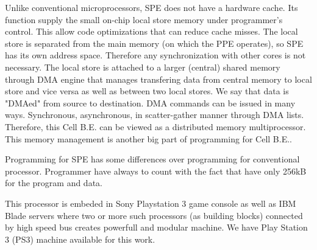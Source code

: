 \par
Unlike conventional microprocessors, SPE does not have a hardware cache.
Its function supply the small on-chip local store memory under programmer's control.
This allow code optimizations that can reduce cache misses.
The local store is separated from the main memory (on which the PPE operates), so SPE has its own address space.
Therefore any synchronization with other cores is not necessary.
The local store is attached to a larger (central) shared memory through DMA engine that manages transfering data from central memory to local store and vice versa as well as between two local stores.
We say that data is "DMAed" from source to destination.
DMA commands can be issued in many ways.
Synchronous, asynchronous, in scatter-gather manner through DMA lists.
Therefore, this Cell B.E. can be viewed as a distributed memory multiprocessor.
This memory management is another big part of programming for Cell B.E..

\par
Programming for SPE has some differences over programming for conventional processor.
Programmer have always to count with the fact that have only 256kB for the program and data.

\par
This processor is embeded in Sony Playstation 3 game console as well as IBM Blade servers where two or more such processors (as building blocks) connected by high speed bus creates powerfull and modular machine.
We have Play Station 3 (PS3) machine available for this work.